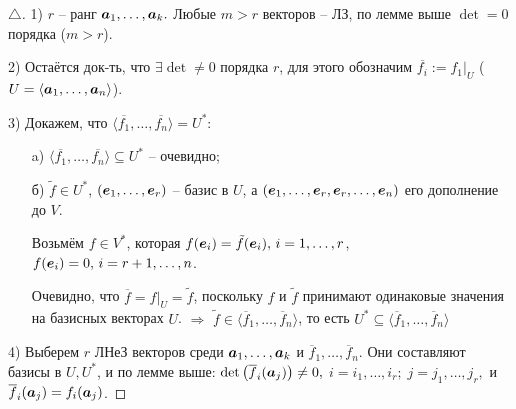 \begin{proof}[$\triangle$]
	1) $r$ -- ранг $\mbox{\boldmath $a$}_1,\ldots,\mbox{\boldmath $a$}_k.$ Любые $m>r$ векторов -- ЛЗ, по лемме выше $\det = 0$ порядка ($m>r$).

	2) Остаётся док-ть, что $\exists \det \neq 0$ порядка $r$, для этого обозначим $\overline{f_i}:= f_1 \big|_U$ ($U = \langle \mbox{\boldmath $a$}_1,\ldots,\mbox{\boldmath $a$}_n\rangle$).

	3) Докажем, что $\langle \overline{f_1}, \ldots, \overline{f_n}\rangle = U^*$:
	\begin{enumerate}
		\item[a)] $\langle \overline{f_1}, \ldots, \overline{f_n}\rangle \subseteq U^*$ -- очевидно;
		\item[б)] $\tilde{f} \in U^*$, $(\mbox{\boldmath $e$}_1,\ldots,\mbox{\boldmath $e$}_r)$ -- базис в $U$, а $(\mbox{\boldmath $e$}_1,\ldots,\mbox{\boldmath $e$}_r, \mbox{\boldmath $e$}_r,\ldots, \mbox{\boldmath $e$}_n)$ его дополнение до $V$.

		Возьмём $f \in V^*$, которая $f(\mbox{\boldmath $e$}_i) = \tilde f(\mbox{\boldmath $e$}_i), \, i = 1,\ldots,r$, $f(\mbox{\boldmath $e$}_i)=0, \, i = r+1,\ldots,n$.

		Очевидно, что $\overline{f} = f \big|_U = \tilde{f}$, поскольку $f$ и $\tilde{f}$ принимают одинаковые значения на базисных векторах $U$. $\Rightarrow$ $\tilde{f} \in \langle \overline{f}_1,\ldots, \overline{f}_n\rangle$, то есть $U^* \subseteq \langle \overline{f}_1,\ldots, \overline{f}_n\rangle$
	\end{enumerate}

	4) Выберем $r$ ЛНеЗ векторов среди $\mbox{\boldmath $a$}_1, \ldots, \mbox{\boldmath $a$}_k$ и $\overline{f}_1,\ldots,\overline{f}_n$. Они составляют базисы в $U, U^*$, и по лемме выше:
	$\det\left(\overline{f}_i(\mbox{\boldmath $a$}_j)\right) \neq 0,$ $ i = i_1,\ldots, i_r;\; j = j_1,\ldots,j_r,$ и $\overline{f}_i(\mbox{\boldmath $a$}_j) = f_i(\mbox{\boldmath $a$}_j)$.
\end{proof}